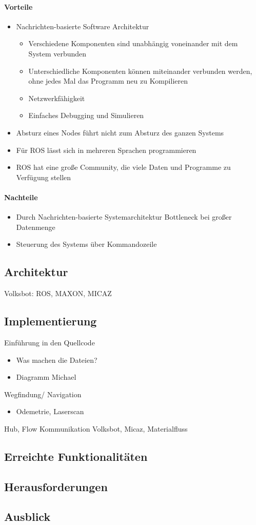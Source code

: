 \paragraph{Vorteile}
\begin{itemize}
 \item Nachrichten-basierte Software Architektur
\begin{itemize}
\item Verschiedene Komponenten sind unabhängig voneinander mit dem System verbunden
\item Unterschiedliche Komponenten können miteinander verbunden werden, ohne jedes Mal das Programm neu zu Kompilieren
\item Netzwerkfähigkeit
\item Einfaches Debugging und Simulieren
\end{itemize}
\item Absturz eines Nodes führt nicht zum Absturz des ganzen
Systems
\item Für ROS lässt sich in mehreren Sprachen programmieren
\item ROS hat eine große Community, die viele Daten und Programme zu Verfügung
stellen
\end{itemize}
\paragraph{Nachteile}
\begin{itemize}
 \item Durch Nachrichten-basierte Systemarchitektur Bottleneck bei großer Datenmenge
\item Steuerung des Systems über Kommandozeile
\end{itemize}

\subsection{Architektur}
Volksbot: ROS, MAXON, MICAZ
\subsection{Implementierung}
Einführung in den Quellcode
\begin{itemize}
\item Was machen die Dateien? 
\item Diagramm Michael
\end{itemize}
Wegfindung/ Navigation
\begin{itemize}
\item Odemetrie, Laserscan
\end{itemize}
Hub, Flow
Kommunikation Volksbot, Micaz, Materialfluss

\subsection{Erreichte Funktionalitäten}
\subsection{Herausforderungen}
\subsection{Ausblick}


